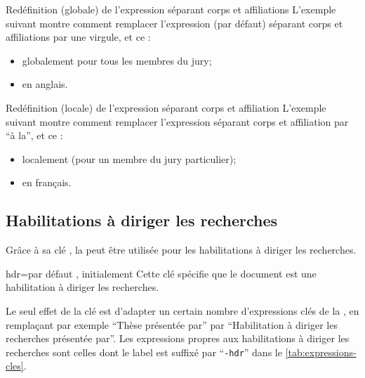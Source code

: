 \begin{dbexample}{Redéfinition (globale) de l'expression séparant corps et
    affiliations}{}
  L'exemple suivant montre comment remplacer l'expression (par défaut) séparant
  corps et affiliations par une virgule, et ce :
  \begin{itemize}
  \item globalement pour tous les membres du jury;
  \item en anglais.
  \end{itemize}
\end{dbexample}

\begin{dbexample}{Redéfinition (locale) de l'expression séparant corps et
    affiliation}{}
  L'exemple suivant montre comment remplacer l'expression séparant corps et
  affiliation par \enquote{\textvisiblespace{}à la\textvisiblespace{}}, et ce :
  \begin{itemize}
  \item localement (pour un membre du jury particulier);
  \item en français.
  \end{itemize}
\begin{bodycode}[listing options={showspaces}]
\end{bodycode}
\end{dbexample}

\subsection{Habilitations à diriger les recherches}
\label{sec:hdr}
%
Grâce à sa clé , la \yatcl{} peut être utilisée pour
les habilitations à diriger les recherches.

\begin{docKey}{hdr}{=\textbar{}}{par défaut
    , initialement }
  Cette clé spécifie que le document est une habilitation à diriger les
  recherches.
\end{docKey}

Le seul effet de la clé  est d'adapter un certain nombre
d'expressions clés de la \yatcl{}, en remplaçant par exemple \enquote{Thèse
  présentée par} par \enquote{Habilitation à diriger les recherches présentée
  par}. Les expressions propres aux habilitations à diriger les recherches sont
celles dont le label est suffixé par \enquote{\texttt{-hdr}} dans le
\vref{tab:expressions-cles}.

